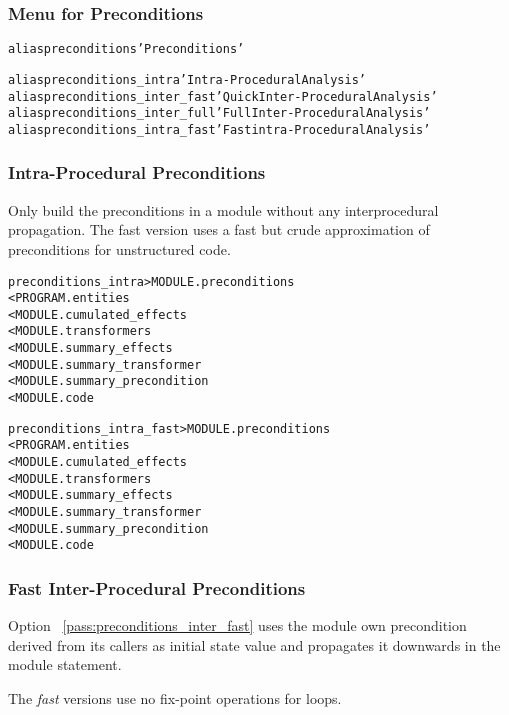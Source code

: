 \documentclass[a4paper]{report}
\newenvironment{PipsMake}{\begin{alltt}}{\end{alltt}}
\newcommand{\PipsPassRef}[1]{\texttt{\detokenize{#1}}~\ref{pass:#1}}
\newenvironment{PipsPass}[1]{\label{pass:#1}}{}
\begin{document}
\subsubsection{Menu for Preconditions}

\begin{PipsMake}
alias preconditions 'Preconditions'

alias preconditions_intra 'Intra-Procedural Analysis'
alias preconditions_inter_fast 'Quick Inter-Procedural Analysis'
alias preconditions_inter_full 'Full Inter-Procedural Analysis'
alias preconditions_intra_fast 'Fast intra-Procedural Analysis'
\end{PipsMake}

\subsubsection{Intra-Procedural Preconditions}

\begin{PipsPass}{preconditions_intra}
Only build the preconditions in a module without any interprocedural
propagation. The fast version uses a fast but crude approximation of
preconditions for unstructured code.
\end{PipsPass}

\begin{PipsMake}
preconditions_intra            > MODULE.preconditions
        < PROGRAM.entities
        < MODULE.cumulated_effects
        < MODULE.transformers
        < MODULE.summary_effects
        < MODULE.summary_transformer
        < MODULE.summary_precondition
        < MODULE.code
\end{PipsMake}

\begin{PipsMake}
preconditions_intra_fast            > MODULE.preconditions
        < PROGRAM.entities
        < MODULE.cumulated_effects
        < MODULE.transformers
        < MODULE.summary_effects
        < MODULE.summary_transformer
        < MODULE.summary_precondition
        < MODULE.code
\end{PipsMake}

\subsubsection{Fast Inter-Procedural Preconditions}

\begin{PipsPass}{preconditions_inter_fast}
Option \PipsPassRef{preconditions_inter_fast} uses the module own precondition
derived from its callers as initial state value and propagates it
downwards in the module statement.

The {\em fast} versions use no fix-point operations for loops.
\end{PipsPass}
\end{document}
